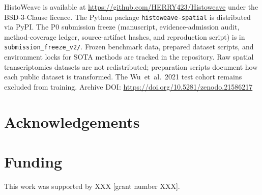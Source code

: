 \documentclass[]{bioinfo}
\begin{document}
HistoWeave is available at
\url{https://github.com/HERRY423/Histoweave} under the BSD-3-Clause
licence. The Python package \texttt{histoweave-spatial} is distributed
via PyPI. The P0 submission freeze (manuscript, evidence-admission audit,
method-coverage ledger, source-artifact hashes, and reproduction script)
is in \texttt{submission\_freeze\_v2/}. Frozen benchmark
data, prepared dataset scripts, and environment locks for SOTA methods
are tracked in the repository. Raw spatial transcriptomics datasets are
not redistributed; preparation scripts document how each public dataset
is transformed. The Wu~et~al.\ 2021 test cohort remains excluded from
training.
Archive DOI: \url{https://doi.org/10.5281/zenodo.21586217}

\section*{Acknowledgements}


\section*{Funding}

This work was supported by XXX [grant number XXX].


% 
\end{document}
